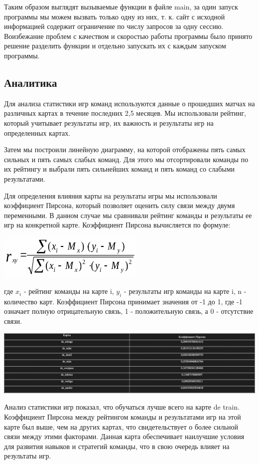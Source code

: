 \documentclass[utf8,14pt,a4paper,oneside,russian]{book}
\begin{document}
Таким образом выглядят вызываемые функции в файле main, за один 
запуск программы мы можем вызвать только одну из них, т. к. сайт 
с исходной информацией содержит ограничение по числу запросов за 
одну сессию. Воизбежание проблем с качеством и скоростью работы
программы было принято решение разделить функции и отдельно запускать 
их с каждым запуском программы.


\newpage
\subsection{Аналитика}

Для анализа статистики игр команд используются данные о 
прошедших матчах на различных картах в течение последних 
2,5 месяцев. Мы использовали рейтинг, который учитывает 
результаты игр, их важность и результаты игр на определенных картах.

Затем мы построили линейную диаграмму, на которой отображены пять 
самых сильных и пять самых слабых команд. Для этого мы отсортировали 
команды по их рейтингу и выбрали пять сильнейших команд и пять команд
со слабыми результатами.

Для определения влияния карты на результаты игры мы использовали 
коэффициент Пирсона, который позволяет оценить силу связи между 
двумя переменными. В данном случае мы сравнивали рейтинг команды 
и результаты ее игр на конкретной карте. Коэффициент Пирсона 
вычисляется по формуле:

\includegraphics[width=7cm]{form}

где \(x_i\) - рейтинг команды на карте i, \(y_i\) - результаты игр 
команды на карте i, n - количество карт. Коэффициент Пирсона принимает 
значения от -1 до 1, где -1 означает полную отрицательную связь, 
1 - положительную связь, а 0 - отсутствие связи.

\includegraphics[width=15cm]{table}

Анализ статистики игр показал, что обучаться лучше всего на карте 
de train. Коэффициент Пирсона между рейтингом команды и результатами 
игр на этой карте был выше, чем на других картах, что свидетельствует 
о более сильной связи между этими факторами. Данная карта обеспечивает 
наилучшие условия для развития навыков и стратегий команды, что в свою 
очередь влияет на результаты игр.
\end{document}
